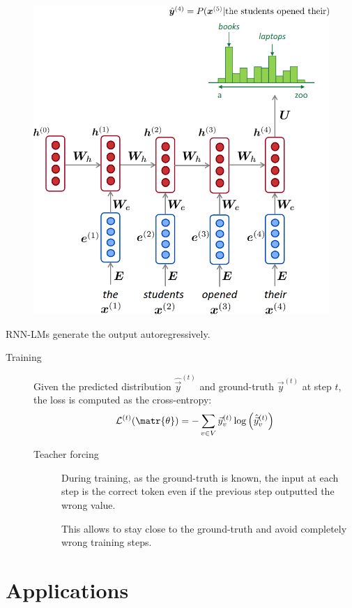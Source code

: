 \begin{description}
    \begin{figure}[H]
        \centering
        \includegraphics[width=0.4\linewidth]{./img/rnn_lm.png}
    \end{figure}

    \begin{remark}
        RNN-LMs generate the output autoregressively.
    \end{remark}

    \begin{description}
        \item[Training]
            Given the predicted distribution $\hat{\vec{y}}^{(t)}$ and ground-truth $\vec{y}^{(t)}$ at step $t$, the loss is computed as the cross-entropy:
            \[ \mathcal{L}^{(t)}(\matr{\theta}) = - \sum_{v \in V} \vec{y}_v^{(t)} \log\left( \hat{\vec{y}}_v^{(t)} \right) \]

            \begin{description}
                \item[Teacher forcing] 
                    During training, as the ground-truth is known, the input at each step is the correct token even if the previous step outputted the wrong value.

                    \begin{remark}
                        This allows to stay close to the ground-truth and avoid completely wrong training steps.
                    \end{remark}
            \end{description}
    \end{description}
\end{description}



\section{Applications}

